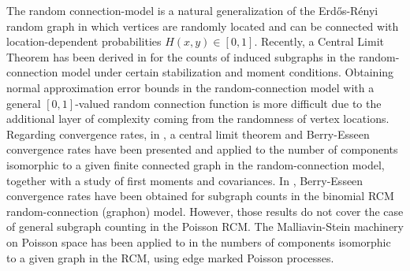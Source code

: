 \documentclass[bj,authoryear,noshowframe]{imsart}
\theoremstyle{plain}
\theoremstyle{remark}
\begin{document}
 The random connection-model is a natural generalization of the %
 Erd\H os-R\'enyi random graph in which vertices are randomly located
 and can be connected
 with location-dependent probabilities
 $H(x,y)\in [0,1]$.
 Recently, a Central Limit Theorem has been derived in \cite{can2022} for the counts of induced subgraphs in the random-connection model under certain stabilization and moment conditions. 
 Obtaining normal approximation error bounds 
 in the random-connection model
 with a general $[0,1]$-valued random connection function 
 is more difficult due to the additional layer of complexity coming from
 the randomness of vertex locations.
 Regarding convergence rates, in \cite{LNS21},
 a central limit theorem and Berry-Esseen convergence rates have
 been presented and applied to the number of components isomorphic
 to a given finite connected graph in the random-connection model,
 together with a study of ﬁrst moments and covariances.
 In \cite{zhangzs}, Berry-Esseen convergence rates have
 been obtained for subgraph counts
 in the binomial RCM random-connection (graphon) model. 
 However, those results do not cover the case of
 general subgraph counting in the Poisson RCM. 
   The Malliavin-Stein machinery on Poisson space \cite{lastpeccatipenrose} has been applied to in \cite{LNS21} the numbers of components isomorphic to a given graph in the RCM, using edge marked Poisson processes.
\end{document}

